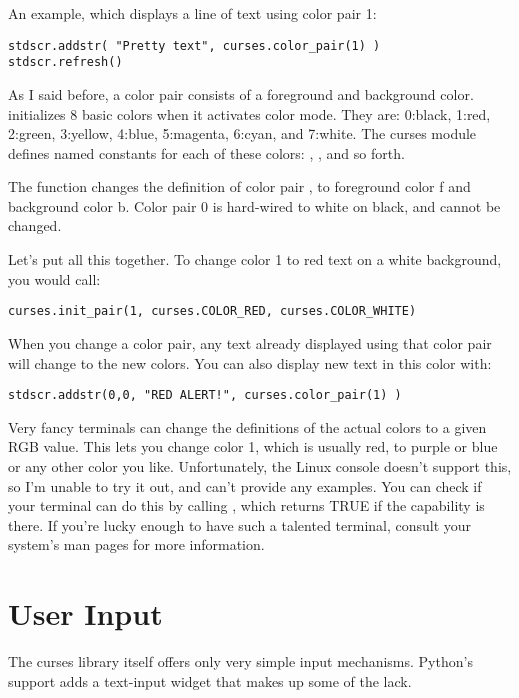 \documentclass{howto}
\begin{document}
An example, which displays a line of text using color pair 1:

\begin{verbatim}
stdscr.addstr( "Pretty text", curses.color_pair(1) )
stdscr.refresh()
\end{verbatim}

As I said before, a color pair consists of a foreground and
background color.   initializes 8 basic
colors when it activates color mode.  They are: 0:black, 1:red,
2:green, 3:yellow, 4:blue, 5:magenta, 6:cyan, and 7:white.  The curses
module defines named constants for each of these colors:
, , and so
forth.

The  function changes the
definition of color pair , to foreground color {f} and
background color {b}.  Color pair 0 is hard-wired to white on black,
and cannot be changed.  

Let's put all this together. To change color 1 to red
text on a white background, you would call:

\begin{verbatim}
curses.init_pair(1, curses.COLOR_RED, curses.COLOR_WHITE)
\end{verbatim}

When you change a color pair, any text already displayed using that
color pair will change to the new colors.  You can also display new
text in this color with:

\begin{verbatim}
stdscr.addstr(0,0, "RED ALERT!", curses.color_pair(1) )
\end{verbatim}

Very fancy terminals can change the definitions of the actual colors
to a given RGB value.  This lets you change color 1, which is usually
red, to purple or blue or any other color you like.  Unfortunately,
the Linux console doesn't support this, so I'm unable to try it out,
and can't provide any examples.  You can check if your terminal can do
this by calling , which returns TRUE if
the capability is there.  If you're lucky enough to have such a
talented terminal, consult your system's man pages for more
information.

\section{User Input}

The curses library itself offers only very simple input mechanisms.
Python's support adds a text-input widget that makes up some of the
lack.
\end{document}
